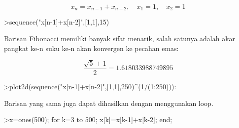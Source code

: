 \documentclass[12pt,Times new roman,letterpaper]{book}
\begin{document}
\begin{eulernootebook}
\begin{eulercomment}
\begin{eulercomment}
\begin{eulernootebook}
\begin{eulercomment}
\begin{eulercomment}
\begin{eulercomment}
\begin{eulercomment}
\begin{eulercomment}
\begin{eulercomment}
\begin{eulernotebook}
\begin{eulercomment}
\begin{eulercomment}
\begin{eulercomment}
\begin{eulercomment}
\begin{eulercomment}
\begin{eulercomment}
\begin{eulercomment}
\begin{eulercomment}
\begin{eulercomment}
\begin{eulercomment}
\begin{eulercomment}
\begin{eulercomment}
\begin{eulercomment}
\begin{eulercomment}
\begin{eulercomment}
\begin{eulercomment}
\begin{eulercomment}
\begin{eulercomment}
\begin{eulercomment}
\begin{eulercomment}
\begin{eulercomment}
\begin{eulercomment}
\begin{eulercomment}
\begin{eulercomment}
\begin{eulercomment}
\begin{eulercomment}
\begin{eulercomment}
\end{eulercomment}
\begin{eulerformula}
\[
x_n = x_{n-1}+x_{n-2}, \quad x_1=1, \quad x_2 =1
\]
\end{eulerformula}
\begin{eulerprompt}
>sequence("x[n-1]+x[n-2]",[1,1],15)
\end{eulerprompt}
\begin{euleroutput}
  [1,  1,  2,  3,  5,  8,  13,  21,  34,  55,  89,  144,  233,  377,  610]
\end{euleroutput}
\begin{eulercomment}
Barisan Fibonacci memiliki banyak sifat menarik, salah satunya adalah
akar pangkat ke-n suku ke-n akan konvergen ke pecahan emas:
\end{eulercomment}
\begin{eulerformula}
\[
\frac{\sqrt{5}+1}{2}=1.618033988749895
\]
\end{eulerformula}
\begin{eulerprompt}
>plot2d(sequence("x[n-1]+x[n-2]",[1,1],250)^(1/(1:250))):
\end{eulerprompt}
\begin{eulercomment}
Barisan yang sama juga dapat dihasilkan dengan menggunakan loop.
\end{eulercomment}
\begin{eulerprompt}
>x=ones(500); for k=3 to 500; x[k]=x[k-1]+x[k-2]; end;
\end{eulerprompt}
\begin{eulercomment}

\end{eulercomment}
\end{eulercomment}
\end{eulercomment}
\end{eulercomment}
\end{eulercomment}
\end{eulercomment}
\end{eulercomment}
\end{eulercomment}
\end{eulercomment}
\end{eulercomment}
\end{eulercomment}
\end{eulercomment}
\end{eulercomment}
\end{eulercomment}
\end{eulercomment}
\end{eulercomment}
\end{eulercomment}
\end{eulercomment}
\end{eulercomment}
\end{eulercomment}
\end{eulercomment}
\end{eulercomment}
\end{eulercomment}
\end{eulercomment}
\end{eulercomment}
\end{eulercomment}
\end{eulercomment}
\end{eulernotebook}
\end{eulercomment}
\end{eulercomment}
\end{eulercomment}
\end{eulercomment}
\end{eulercomment}
\end{eulercomment}
\end{eulernootebook}
\end{eulercomment}
\end{eulercomment}
\end{eulernootebook}
\end{document}
